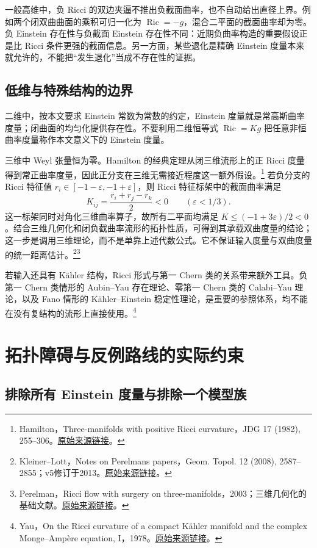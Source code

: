 \documentclass[11pt,a4paper]{article}
\theoremstyle{definition}
\newcommand{\Ric}{\operatorname{Ric}}
\newcommand{\src}[3]{\footnote{\raggedright #1，#2。\href{#3}{原始来源链接}。}}
\begin{document}
一般高维中，负 Ricci 的双边夹逼不推出负截面曲率，也不自动给出直径上界。例如两个闭双曲曲面的乘积可归一化为 $\Ric=-g$，混合二平面的截面曲率却为零。负 Einstein 存在性与负截面 Einstein 存在性不同：近期负曲率构造的重要假设正是比 Ricci 条件更强的截面信息。另一方面，某些退化是精确 Einstein 度量本来就允许的，不能把“发生退化”当成不存在性的证据。

\subsection{低维与特殊结构的边界}

二维中，按本文要求 Einstein 常数为常数的约定，Einstein 度量就是常高斯曲率度量；闭曲面的均匀化提供存在性。不要利用二维恒等式 $\Ric=Kg$ 把任意非恒曲率度量称作本文意义下的 Einstein 度量。

三维中 Weyl 张量恒为零。Hamilton 的经典定理从闭三维流形上的正 Ricci 度量得到常正曲率度量，因此正分支在三维无需接近程度这一额外假设。\src{Hamilton}{Three-manifolds with positive Ricci curvature，JDG 17 (1982), 255--306}{https://doi.org/10.4310/jdg/1214436922}
若负分支的 Ricci 特征值 $r_i\in[-1-\varepsilon,-1+\varepsilon]$，则 Ricci 特征标架中的截面曲率满足
\[
K_{ij}=\frac{r_i+r_j-r_k}{2}<0\qquad(\varepsilon<1/3).
\]
这一标架同时对角化三维曲率算子，故所有二平面均满足 $K\le(-1+3\varepsilon)/2<0$。结合三维几何化和闭负截曲率流形的拓扑性质，可得到其承载双曲度量的结论；这一步是调用三维理论，而不是单靠上述代数公式。它不保证输入度量与双曲度量的统一距离估计。\src{Kleiner--Lott}{Notes on Perelman\textquotesingle s papers，Geom. Topol. 12 (2008), 2587--2855；v5修订于2013}{https://arxiv.org/abs/math/0605667v5}\src{Perelman}{Ricci flow with surgery on three-manifolds，2003；三维几何化的基础文献}{https://arxiv.org/abs/math/0303109}

若输入还具有 Kähler 结构，Ricci 形式与第一 Chern 类的关系带来额外工具。负第一 Chern 类情形的 Aubin--Yau 存在理论、零第一 Chern 类的 Calabi--Yau 理论，以及 Fano 情形的 Kähler--Einstein 稳定性理论，是重要的参照体系，均不能在没有复结构的流形上直接使用。\src{Yau}{On the Ricci curvature of a compact Kähler manifold and the complex Monge--Ampère equation, I，1978}{https://doi.org/10.1002/cpa.3160310304}

\section{拓扑障碍与反例路线的实际约束}\label{sec:obstruction}

\subsection{排除所有 Einstein 度量与排除一个模型族}
\end{document}
